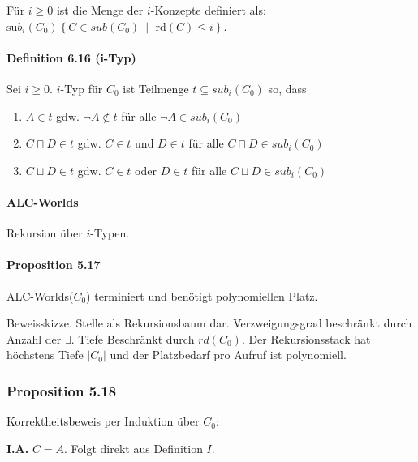 Für $i \geq 0$ ist die Menge der $i$-Konzepte definiert als:
$\text{su}b_{i}\left( C_{0} \right) \left\{ C \in sub\left( C_{0} \right)\  \middle| \text{\ rd}\left( C \right) \leq i \right\}$.

\paragraph{Definition 6.16 (i-Typ)}\label{definition-6.16-i-typ}

Sei $i \geq 0$. $i$-Typ für $C_{0}$ ist Teilmenge
$t \subseteq sub_{i}\left( C_{0} \right)$ so, dass

\begin{enumerate}
\def\labelenumi{\arabic{enumi}.}
\item
  $A \in t$ gdw. $\neg A \notin t$ für alle
  $\neg A \in sub_{i}\left( C_{0} \right)$
\item
  $C \sqcap D \in t$ gdw. $C \in t$ und $D \in t$ für alle
  $C \sqcap D \in sub_{i}\left( C_{0} \right)$
\item
  $C \sqcup D \in t$ gdw. $C \in t$ oder $D \in t$ für alle
  $C \sqcup D \in sub_{i}\left( C_{0} \right)$
\end{enumerate}

\paragraph{ALC-Worlds}\label{alc-worlds-1}

Rekursion über $i$-Typen.

\paragraph{Proposition 5.17}\label{proposition-5.17}

ALC-Worlds($C_{0}$) terminiert und benötigt polynomiellen Platz.

Beweisskizze. Stelle als Rekursionsbaum dar. Verzweigungsgrad beschränkt
durch Anzahl der $\exists$. Tiefe Beschränkt durch $rd(C_{0})$. Der
Rekursionsstack hat höchstens Tiefe $\left| C_{0} \right|$ und der
Platzbedarf pro Aufruf ist polynomiell.

\subsubsection{Proposition 5.18}\label{proposition-5.18}

Korrektheitsbeweis per Induktion über $C_{0}$:

\textbf{I.A.} $C = A$. Folgt direkt aus Definition $I$.

